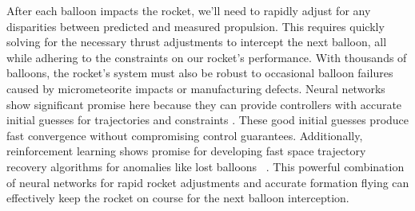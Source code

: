\documentclass{article}
\begin{document}
After each balloon impacts the rocket, we'll need to rapidly adjust for any disparities between predicted and measured propulsion. This requires quickly solving for the necessary thrust adjustments to intercept the next balloon, all while adhering to the constraints on our rocket's performance. With thousands of balloons, the rocket's system must also be robust to occasional balloon failures caused by micrometeorite impacts or manufacturing defects. Neural networks show significant promise here because they can provide controllers with accurate initial guesses for trajectories \cite{guffanti2024transformerstrajectoryoptimizationapplication} and constraints \cite{briden_constraint}.   These good initial guesses produce fast convergence without compromising control guarantees.   Additionally, reinforcement learning shows promise for developing fast space trajectory recovery algorithms for anomalies like lost balloons \ \cite{zavoli2021reinforcement}.   This powerful combination of neural networks for rapid rocket adjustments and accurate formation flying can effectively keep the rocket on course for the next balloon interception.
\end{document}
